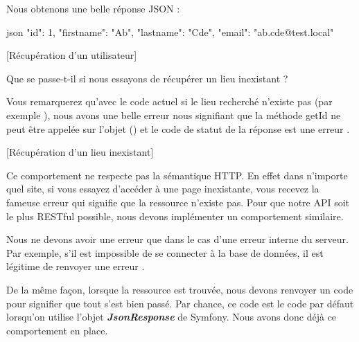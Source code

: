 \documentclass[big]{zmdocument}
\begin{document}
Nous obtenons une belle réponse JSON :



\begin{CodeBlock}{json}
{
  "id": 1,
  "firstname": "Ab",
  "lastname": "Cde",
  "email": "ab.cde@test.local"
}
\end{CodeBlock}



[Récupération d'un utilisateur]






Que se passe-t-il si nous essayons de récupérer un lieu inexistant ?



Vous remarquerez qu'avec le code actuel si le lieu recherché n'existe pas (par exemple ), nous avons une belle erreur nous signifiant que la méthode getId ne peut être appelée sur l'objet  () et le code de statut de la réponse est une erreur .



[Récupération d'un lieu inexistant]


Ce comportement ne respecte pas la sémantique HTTP. En effet dans n'importe quel site, si vous essayez d'accéder à une page inexistante, vous recevez la fameuse erreur  qui signifie que la ressource n'existe pas. Pour que notre API soit le plus RESTful possible, nous devons implémenter un comportement similaire.



Nous ne devons avoir une erreur  que dans le cas d'une erreur interne du serveur. Par exemple, s'il est impossible de se connecter à la base de données, il est légitime de renvoyer une erreur .



De la même façon, lorsque la ressource est trouvée, nous devons renvoyer un code  pour signifier que tout s'est bien passé. Par chance, ce code est le code par défaut lorsqu'on utilise l'objet \textbf{\textit{JsonResponse}} de Symfony. Nous avons donc déjà ce comportement en place.
\end{document}

